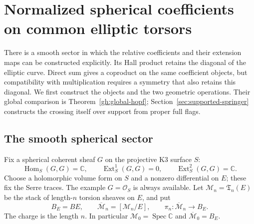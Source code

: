 \section{Normalized spherical coefficients on common elliptic torsors}
\label{sec:spherical-hall}

There is a smooth sector in which the relative coefficients and their
extension maps can be constructed explicitly. Its Hall product retains
the diagonal of the elliptic curve. Direct sum gives a coproduct on the
same coefficient objects, but compatibility with multiplication requires
a symmetry that also retains this diagonal. We first construct the
objects and the two geometric operations. Their global comparison
is Theorem~\ref{gh:global-hopf}; Section~\ref{sec:supported-springer}
constructs the crossing itself over support from proper full flags.

\subsection{The smooth spherical sector}

Fix a spherical coherent sheaf $G$ on the projective K3 surface $S$:
\[
 \operatorname{Hom}_S(G,G)=\mathbb C,\qquad
 \operatorname{Ext}^1_S(G,G)=0,\qquad
 \operatorname{Ext}^2_S(G,G)=\mathbb C.
\]
Choose a holomorphic volume form on $S$ and a nonzero differential on
$E$; these fix the Serre traces. The example $G=\mathcal O_S$ is always
available. Let $\mathcal M_n=\mathfrak T_n(E)$ be the stack of
length-$n$ torsion sheaves on $E$, and put
\[
 B_E=BE,\qquad
 \overline{\mathcal M}_n=[\mathcal M_n/E],\qquad
 \pi_n:\overline{\mathcal M}_n\longrightarrow B_E.
\]
The charge is the length $n$. In particular
$\mathcal M_0=\operatorname{Spec}\mathbb C$ and
$\overline{\mathcal M}_0=B_E$.


